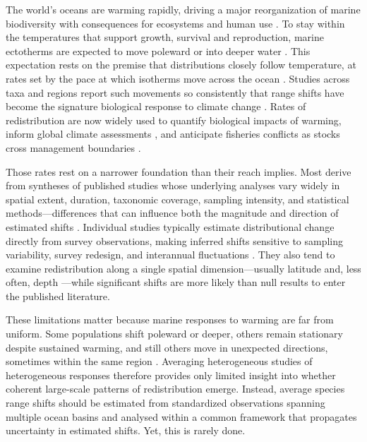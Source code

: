 \documentclass[9pt,twocolumn,twoside]{pnas-new}
\begin{document}
The world's oceans are warming rapidly, driving a major reorganization of marine biodiversity with consequences for ecosystems and human use \citep{ipcc_ocean_2022, pecl_biodiversity_2017}. To stay within the temperatures that support growth, survival and reproduction, marine ectotherms are expected to move poleward or into deeper water \citep{sundayThermalToleranceGlobal2012}. This expectation rests on the premise that distributions closely follow temperature, at rates set by the pace at which isotherms move across the ocean \citep{burrows_pace_2011}. Studies across taxa and regions report such movements so consistently that range shifts have become the signature biological response to climate change \citep{parmesan_globally_2003, parmesan_ecological_2006, poloczanska_global_2013, poloczanska_responses_2016}. Rates of redistribution are now widely used to quantify biological impacts of warming, inform global climate assessments \citep{ipcc_ocean_2022, poloczanska_responses_2016}, and anticipate fisheries conflicts as stocks cross management boundaries \citep{pinsky_preparing_2018, palacios-abrantes_climate_2025}.
 
Those rates rest on a narrower foundation than their reach implies. Most derive from syntheses of published studies whose underlying analyses vary widely in spatial extent, duration, taxonomic coverage, sampling intensity, and statistical methods---differences that can influence both the magnitude and direction of estimated shifts \citep{poloczanska_global_2013, brown_ecological_2016, lenoir_species_2020, lawlor_mechanisms_2024}. Individual studies typically estimate distributional change directly from survey observations, making inferred shifts sensitive to sampling variability, survey redesign, and interannual fluctuations \citep{thorson_model-based_2016}. They also tend to examine redistribution along a single spatial dimension---usually latitude and, less often, depth \citep{lenoir_climate-related_2015}---while significant shifts are more likely than null results to enter the published literature.

\Parasplit

These limitations matter because marine responses to warming are far from uniform. Some populations shift poleward or deeper, others remain stationary despite sustained warming, and still others move in unexpected directions, sometimes within the same region \citep{rubenstein_climate_2023, fuchs_wrong-way_2020, lawlor_mechanisms_2024}. Averaging heterogeneous studies of heterogeneous responses therefore provides only limited insight into whether coherent large-scale patterns of redistribution emerge. Instead, average species range shifts should be estimated from standardized observations spanning multiple ocean basins and analysed within a common framework that propagates uncertainty in estimated shifts. Yet, this is rarely done.
\end{document}
